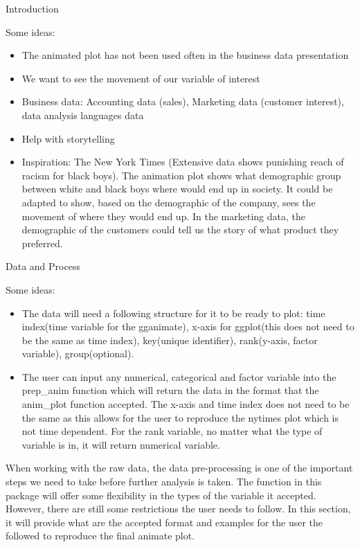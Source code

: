 Introduction

Some ideas:

\begin{itemize}
\tightlist
\item
  The animated plot has not been used often in the business data presentation
\item
  We want to see the movement of our variable of interest
\item
  Business data: Accounting data (sales), Marketing data (customer interest), data analysis languages data
\item
  Help with storytelling
\item
  Inspiration: The New York Times (Extensive data shows punishing reach of racism for black boys). The animation plot shows what demographic group between white and black boys where would end up in society. It could be adapted to show, based on the demographic of the company, sees the movement of where they would end up. In the marketing data, the demographic of the customers could tell us the story of what product they preferred.
\end{itemize}

Data and Process

Some ideas:

\begin{itemize}
\item
  The data will need a following structure for it to be ready to plot: time index(time variable for the gganimate), x-axis for ggplot(this does not need to be the same as time index), key(unique identifier), rank(y-axis, factor variable), group(optional).
\item
  The user can input any numerical, categorical and factor variable into the prep\_anim function which will return the data in the format that the anim\_plot function accepted. The x-axis and time index does not need to be the same as this allows for the user to reproduce the nytimes plot which is not time dependent. For the rank variable, no matter what the type of variable is in, it will return numerical variable.
\end{itemize}

When working with the raw data, the data pre-processing is one of the important steps we need to take before further analysis is taken. The function in this package will offer some flexibility in the types of the variable it accepted. However, there are still some restrictions the user needs to follow. In this section, it will provide what are the accepted format and examples for the user the followed to reproduce the final animate plot.

